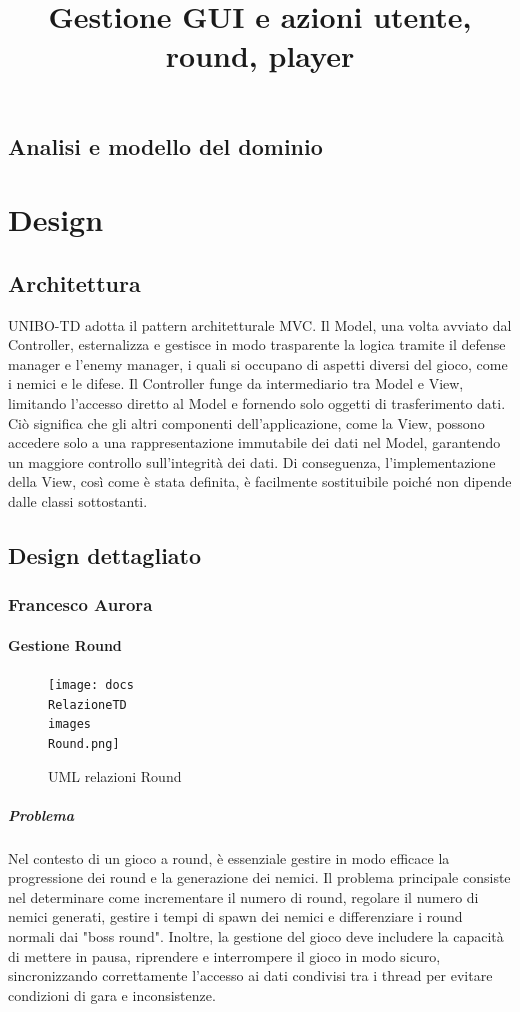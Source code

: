 \documentclass[a4paper,12pt]{report}
\begin{document}
\section{Analisi e modello del dominio}



\chapter{Design}

\section{Architettura}

UNIBO-TD adotta il pattern architetturale MVC. Il Model, una volta avviato dal Controller, esternalizza e gestisce in modo trasparente la logica tramite il defense manager e l'enemy manager, i quali si occupano di aspetti diversi del gioco, come i nemici e le difese. Il Controller funge da intermediario tra Model e View, limitando l'accesso diretto al Model e fornendo solo oggetti di trasferimento dati. Ciò significa che gli altri componenti dell'applicazione, come la View, possono accedere solo a una rappresentazione immutabile dei dati nel Model, garantendo un maggiore controllo sull'integrità dei dati. Di conseguenza, l'implementazione della View, così come è stata definita, è facilmente sostituibile poiché non dipende dalle classi sottostanti.





\section{Design dettagliato}
\subsection{Francesco Aurora}
\title{\textbf{Gestione GUI e azioni utente, round, player}}
\subsubsection{Gestione Round}
\begin{figure}[H]
	\centering{}
	\texttt{[image: docs\\RelazioneTD\\images\\Round.png]}
	\caption{UML relazioni Round}
	\label{img:Gui}
\end{figure}
\paragraph{Problema} Nel contesto di un gioco a round, è essenziale gestire in modo efficace la progressione dei round e la generazione dei nemici. Il problema principale consiste nel determinare come incrementare il numero di round, regolare il numero di nemici generati, gestire i tempi di spawn dei nemici e differenziare i round normali dai "boss round". Inoltre, la gestione del gioco deve includere la capacità di mettere in pausa, riprendere e interrompere il gioco in modo sicuro, sincronizzando correttamente l'accesso ai dati condivisi tra i thread per evitare condizioni di gara e inconsistenze.
\end{document}
